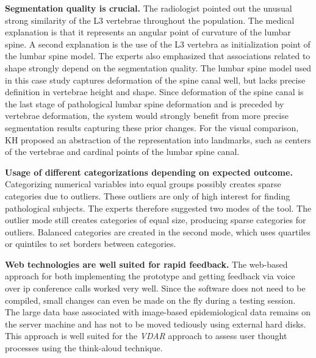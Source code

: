 \documentclass[journal]{style/vgtc} 			          %
\newcommand{\rem}[1]{\textcolor{red}{\sout{#1}}}
\begin{document}
\textbf{Segmentation quality is crucial.}
The radiologist pointed out the unusual strong similarity of the L3 vertebrae throughout the population.
%
The medical explanation is that it represents an angular point of curvature of the lumbar spine.
%
A second explanation is the use of the L3 vertebra as initialization point of the lumbar spine model.
%
The experts also emphasized that associations related to shape strongly depend on the segmentation quality.
%
The lumbar spine model used in this case study captures deformation of the spine canal well, but lacks precise definition in vertebrae height and shape.
%
Since deformation of the spine canal is the last stage of pathological lumbar spine deformation and is preceded by vertebrae deformation, the system would strongly benefit from more precise segmentation results capturing these prior changes.
%
For the visual comparison, KH proposed an abstraction of the representation into landmarks, such as centers of the vertebrae and cardinal points of the lumbar spine canal.

\textbf{Usage of different categorizations depending on expected outcome.}
Categorizing numerical variables into equal groups possibly creates sparse categories due to outliers.%
%
These outliers are only of high interest for finding pathological subjects. %
%
The experts therefore suggested two modes of the tool.
%
The outlier mode still creates categories of equal size, producing sparse categories for outliers.
%
Balanced categories are created in the second mode, which uses quartiles or quintiles to set borders between categories.
%

\textbf{Web technologies are well suited for rapid feedback.}
The web-based approach for both implementing the prototype and getting feedback via voice over ip conference calls worked very well.
%
Since the software does not need to be compiled, small changes can even be made on the fly during a testing session.
%
The large data base associated with image-based epidemiological data remains on the server machine and has not to be moved tediously using external hard disks.
%
This approach is well suited for the \emph{VDAR} approach to assess user thought processes using the think-aloud technique.
\end{document}
